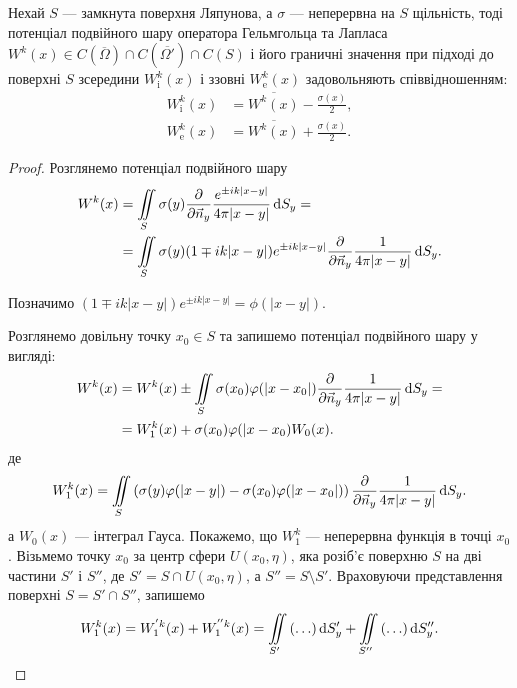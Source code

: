 \begin{theorem}
	Нехай $S$ --- замкнута поверхня Ляпунова, а $\sigma$ --- неперервна на $S$ щільність, тоді потенціал подвійного шару оператора Гельмгольца та Лапласа $W^k(x) \in C (\overline{\Omega}) \cap C (\overline{\Omega'}) \cap C (S)$ і його граничні значення при підході до поверхні $S$ зсередини $W_{\text{i}}^k(x)$ і ззовні $W_{\text{e}}^k(x)$ задовольняють співвідношенням:
	\begin{align}
		W_{\text{i}}^k(x) &= \overline{W^k(x)} - \frac{\sigma(x)}{2}, \\
		W_{\text{e}}^k(x) &= \overline{W^k(x)} + \frac{\sigma(x)}{2}.
	\end{align}
\end{theorem}

\begin{proof}
	Розглянемо потенціал подвійного шару
	\begin{equation}
		\begin{aligned}
			W^k(x) &= \displaystyle\iint\limits_S \sigma(y) \frac{\partial}{\partial \vec n_y} \frac{e^{\pm i k |x - y|}}{4 \pi |x - y|} \mathop{}\!\mathrm{d} S_y = \\
			&= \displaystyle\iint\limits_S \sigma(y) (1 \mp i k |x - y|) e^{\pm i k |x - y|} \frac{\partial}{\partial \vec n_y} \frac{1}{4 \pi |x - y|} \mathop{}\!\mathrm{d} S_y.
		\end{aligned}
	\end{equation}

	Позначимо $(1 \mp i k |x - y|) e^{\pm i k |x - y|} = \phi(|x - y|)$. \medskip

	Розглянемо довільну точку $x_0 \in S$ та запишемо потенціал подвійного шару у вигляді:
	\begin{equation}
		\begin{aligned}
			W^k(x) &= W^k(x) \pm \displaystyle\iint\limits_S \sigma(x_0) \varphi(|x - x_0|) \frac{\partial}{\partial \vec n_y} \frac{1}{4 \pi |x - y|} \mathop{}\!\mathrm{d} S_y = \\
			&= W_1^k(x) + \sigma(x_0) \varphi(|x - x_0) W_0(x).
		\end{aligned}
	\end{equation}
	де
	\begin{equation}
		W_1^k(x) = \displaystyle\iint\limits_S \left( \sigma(y) \varphi(|x - y|) - \sigma(x_0) \varphi(|x - x_0|) \right) \frac{\partial}{\partial \vec n_y} \frac{1}{4 \pi |x - y|} \mathop{}\!\mathrm{d} S_y.
	\end{equation}
	а $W_0(x)$ --- інтеграл Гауса. Покажемо, що $W_1^k$ --- неперервна функція в точці $x_0$. Візьмемо точку $x_0$ за центр сфери $U(x_0, \eta)$, яка розіб'є поверхню $S$ на дві частини $S'$ і $S''$, де $S' = S \cap U(x_0, \eta)$, а $S'' = S \setminus S'$. Враховуючи представлення поверхні $S = S' \cap S''$, запишемо  
	\begin{equation}
		W_1^k(x) = W_1^{'k}(x) + W_1^{''k}(x) = \displaystyle\iint\limits_{S'} \left( \ldots \right) \mathop{}\!\mathrm{d} S_y' + \displaystyle\iint\limits_{S''} \left( \ldots \right) \mathop{}\!\mathrm{d} S_y''.
	\end{equation}
 

\end{proof}
